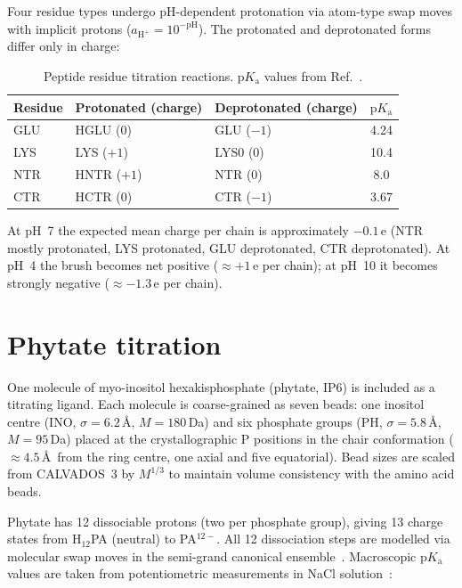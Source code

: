 \documentclass[11pt]{article}
\begin{document}
Four residue types undergo pH-dependent protonation via atom-type swap
moves with implicit protons ($a_{\text{H}^+} = 10^{-\text{pH}}$).
The protonated and deprotonated forms differ only in charge:

\begin{table}[h]
\centering
\begin{tabular}{@{}lllc@{}}
\toprule
Residue & Protonated (charge) & Deprotonated (charge) & $\text{p}K_\text{a}$ \\
\midrule
GLU  & HGLU (0)   & GLU ($-1$)  & 4.24 \\
LYS  & LYS ($+1$) & LYS0 (0)   & 10.4 \\
NTR  & HNTR ($+1$) & NTR (0)   & 8.0  \\
CTR  & HCTR (0)   & CTR ($-1$)  & 3.67 \\
\bottomrule
\end{tabular}
\caption{Peptide residue titration reactions.
  $\text{p}K_\text{a}$ values from Ref.~\cite{Grimsley2009}.}
\end{table}

\noindent
At pH~7 the expected mean charge per chain is approximately $-0.1$\,e
(NTR mostly protonated, LYS protonated, GLU deprotonated, CTR deprotonated).
At pH~4 the brush becomes net positive ($\approx +1$\,e per chain);
at pH~10 it becomes strongly negative ($\approx -1.3$\,e per chain).

\section{Phytate titration}

One molecule of myo-inositol hexakisphosphate (phytate, IP6) is
included as a titrating ligand.  Each molecule is coarse-grained as
seven beads: one inositol centre (INO, $\sigma = 6.2$\,\AA,
$M = 180$\,Da) and six phosphate groups (PH, $\sigma = 5.8$\,\AA,
$M = 95$\,Da) placed at the crystallographic P positions in the
chair conformation ($\approx 4.5$\,\AA\ from the ring centre, one
axial and five equatorial).  Bead sizes are scaled from CALVADOS~3
by $M^{1/3}$ to maintain volume consistency with the amino acid beads.

Phytate has 12 dissociable protons (two per phosphate group),
giving 13 charge states from H$_{12}$PA (neutral) to PA$^{12-}$.
All 12 dissociation steps are modelled via molecular swap moves
in the semi-grand canonical ensemble~\cite{SmithTriska1994}.
Macroscopic $\text{p}K_\text{a}$ values are taken from potentiometric
measurements in NaCl solution~\cite{DeStefano2003}:
\end{document}
